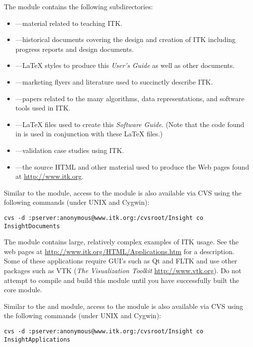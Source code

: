 The  module contains the following subdirectories:
\begin{itemize}
        \item {}---material related to
        teaching ITK.
        \item {}---historical documents covering
        the design and creation of ITK including progress reports and 
        design documents.
        \item {}---\LaTeX{} styles to produce this
        \emph{User's Guide} as well as other documents.
        \item {}---marketing flyers and 
        literature used to succinctly describe ITK.
        \item {}---papers related to the many
        algorithms, data representations, and software tools used in ITK.
        \item {}---\LaTeX{} files used to
        create this \emph{Software Guide}. (Note that the code found in
         is used in conjunction with these \LaTeX{}
        files.)
        \item {}---validation case studies
        using ITK.
        \item {}---the source HTML and other material
        used to produce the Web pages found at \url{http://www.itk.org}.
\end{itemize}

Similar to the  module, access to the 
module is also available via CVS using the following commands (under UNIX and
Cygwin):
\begin{verbatim}
cvs -d :pserver:anonymous@www.itk.org:/cvsroot/Insight co InsightDocuments
\end{verbatim}

The  module contains large, relatively complex
examples of ITK usage. See the web pages at 
\url{http://www.itk.org/HTML/Applications.htm} for a description. Some of 
these applications require GUI's such as Qt and FLTK and use other packages
such as VTK (\emph{The Visualization Toolkit}
\url{http://www.vtk.org}). Do not attempt to compile and build this module
until you have successfully built the core  module.

Similar to the  and  module, access to 
the  module is also available via CVS using the 
following commands (under UNIX and Cygwin):
\begin{verbatim}
cvs -d :pserver:anonymous@www.itk.org:/cvsroot/Insight co InsightApplications
\end{verbatim}

